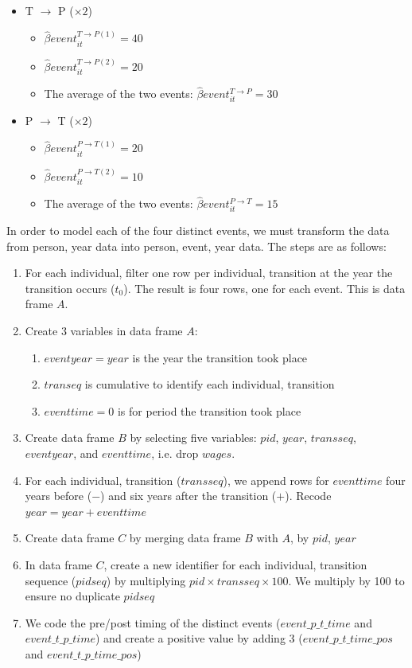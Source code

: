\begin{itemize} 
    \item T $\rightarrow$ P ($\times 2$)
    \begin{itemize} 
        \item $\hat{\beta} event^{T \rightarrow P (1)}_{it} = 40$ 
        \item $\hat{\beta} event^{T \rightarrow P (2)}_{it} = 20$
        \item The average of the two events: $\hat{\beta} event^{T \rightarrow P}_{it} = 30$
    \end{itemize}
    \item P $\rightarrow$ T ($\times 2$)
    \begin{itemize} 
        \item $\hat{\beta} event^{P \rightarrow T (1)}_{it} = 20$
        \item $\hat{\beta} event^{P \rightarrow T (2)}_{it} = 10$
        \item The average of the two events: $\hat{\beta} event^{P \rightarrow T}_{it} = 15$
    \end{itemize}
\end{itemize}

In order to model each of the four distinct events, we must transform the data from person, year data into person, event, year data.  The steps are as follows:

\begin{enumerate}  
    \item For each individual, filter one row per individual, transition at the year the transition occurs ($t_0$).  The result is four rows, one for each event.  This is data frame $A$.
    \item Create 3 variables in data frame $A$:
    \begin{enumerate}
        \item $eventyear=year$ is the year the transition took place  
        \item $transeq$ is cumulative to identify each individual, transition
        \item $eventtime=0$ is for period the transition took place
    \end{enumerate}  
    \item Create data frame $B$ by selecting five variables: $pid$, $year$, $transseq$, $eventyear$, and $eventtime$, i.e. drop $wages$.  
    \item For each individual, transition ($transseq$), we append rows for $eventtime$ four years before ($-$) and six years after the transition ($+$).  Recode $year=year+eventtime$  
    \item Create data frame $C$ by merging data frame $B$ with $A$, by $pid$, $year$ 
    \item In data frame $C$, create a new identifier for each individual, transition sequence ($pidseq$) by multiplying $pid \times transseq \times 100$.  We multiply by 100 to ensure no duplicate $pidseq$
    \item We code the pre/post timing of the distinct events ($event\_p\_t\_time$ and $event\_t\_p\_time$) and create a positive value by adding 3 ($event\_p\_t\_time\_pos$ and $event\_t\_p\_time\_pos$)
\end{enumerate}  


